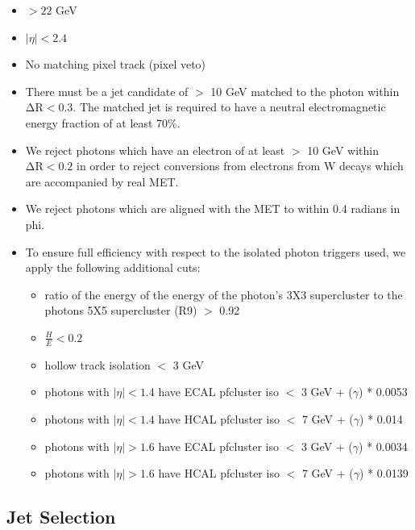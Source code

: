     \begin{itemize}
      \item \pt $ > 22$ GeV
      \item $|\eta| < 2.4$
      \item No matching pixel track (pixel veto)
      \item There must be a jet candidate of \pt $ >$ 10 GeV matched to the photon within $\mathrm{ \Delta R} < 0.3$. 
      The matched jet is required to have a neutral electromagnetic energy fraction of at least 70\%.

      \item We reject photons which have an electron of at least \pt $>$ 10 GeV within $\mathrm{ \Delta R} < 0.2$
      in order to reject conversions from electrons from W decays which are accompanied by real MET.

      \item We reject photons which are aligned with the MET to within 0.4 radians in phi.
      \item To ensure full efficiency with respect to the isolated photon triggers used, we apply the following additional cuts:
      \begin{itemize}
        \item ratio of the energy of the energy of the photon's 3X3 supercluster to the photons 5X5 supercluster (R9) $>$ 0.92
        \item $\frac{H}{E} < 0.2$ %
        \item hollow track isolation $<$ 3 GeV
        \item photons with $|\eta| < 1.4$ have ECAL pfcluster iso $<$ 3 GeV + \pt ($\gamma$) * 0.0053
        \item photons with $|\eta| < 1.4$ have HCAL pfcluster iso $<$ 7 GeV + \pt ($\gamma$) * 0.014
        \item photons with $|\eta| > 1.6$ have ECAL pfcluster iso $<$ 3 GeV + \pt ($\gamma$) * 0.0034
        \item photons with $|\eta| > 1.6$ have HCAL pfcluster iso $<$ 7 GeV + \pt ($\gamma$) * 0.0139
      \end{itemize}
    \end{itemize}

  \subsection{Jet Selection} \label{sec:jet_selection}

